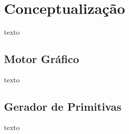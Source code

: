 \section{Conceptualização}

texto

\subsection{Motor Gráfico}

texto

\subsection{Gerador de Primitivas}

texto